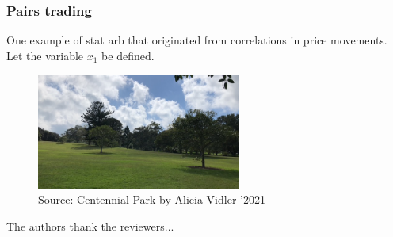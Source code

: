 \documentclass{jfds}
\begin{document}
\subsubsection{Pairs trading} 
One example of stat arb that originated from correlations in price movements. Let the variable \(x_1\) be defined.


\begin{figure}[h]
\centering
\includegraphics[width=0.6\textwidth]{Tree.JPG}
\caption{Source: Centennial Park by Alicia Vidler '2021}
\end{figure}


\begin{acknowledgments}
The authors thank the reviewers...
\end{acknowledgments}

\newpage





\end{document}
